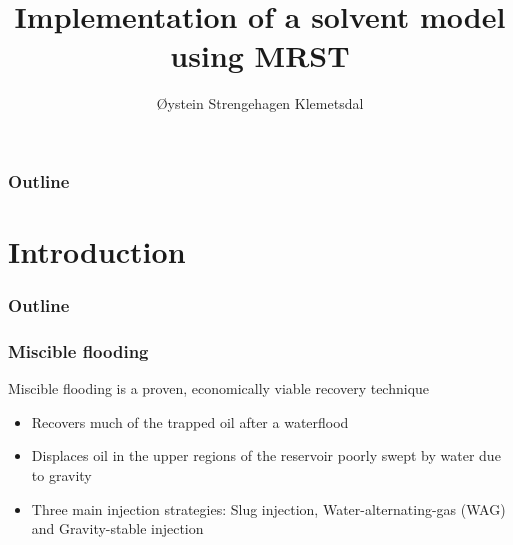 \documentclass[screen, aspectratio=43]{beamer}
\title[Short title]{Implementation of a solvent model using MRST}
\author[Ø.S. Klemetsdal]{Øystein Strengehagen Klemetsdal}
\institute[NTNU]{Department of Mathematical sciences, NTNU}
\date{} %
\begin{document}
\ntnutitlepage

\begin{frame}
  \frametitle{Outline}
  \tableofcontents
\end{frame}

\section{Introduction}

\begin{frame}
  \frametitle{Outline}
  \tableofcontents[currentsection]
\end{frame}


\begin{frame}
  \frametitle{Miscible flooding}
  Miscible flooding is a proven, economically viable recovery technique \cite{petroWiki2017Misc}
  \begin{itemize}
  \item Recovers much of the trapped oil after a waterflood
  \item Displaces oil in the upper regions of the reservoir poorly swept by water due
    to gravity
  \item Three main injection strategies: Slug injection, Water-alternating-gas (WAG) and
    Gravity-stable injection
  \end{itemize}
  \begin{figure}[h]
    \centering
    \hspace{1em}
  \end{figure}
\end{frame}
\end{document}
